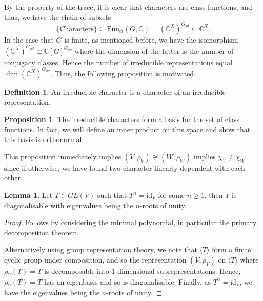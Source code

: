 \documentclass[]{article}
\theoremstyle{definition}
\theoremstyle{definition}
\newtheorem{definition}{Definition}[section]
\newtheorem{lemma}{Lemma}[section]
\newtheorem{proposition}{Proposition}[section]
\begin{document}
By the property of the trace, it is clear that characters are class functions,
and thus, we have the chain of subsets 
\[\{\text{Characters}\} \subseteq \text{Fun}_{cl}(G, \mathbb{C}) = 
(\mathbb{C}^X)^{G_{ad}} \subseteq \mathbb{C}^X.\]
In the case that \(G\) is finite, as mentioned before, we have the isomorphism 
\((\mathbb{C}^X)^{G_{ad}} \cong \mathbb{C}[G]^{G_{ad}}\) where the dimension of 
the latter is the number of conjugacy classes. Hence the number of irreducible 
representations equal \(\dim (\mathbb{C}^X)^{G_{ad}}\). Thus, the following 
proposition is motivated.

\begin{definition}
  An irreducible character is a character of an irreducible representation.
\end{definition}

\begin{proposition}
  The irreducible characters form a basis for the set of class functions. 
  In fact, we will define an inner product on this space and show that 
  this basis is orthonormal.
\end{proposition}

This proposition immediately implies \((V, \rho_V) \not\cong (W, \rho_W)\) 
implies \(\chi_V \neq \chi_W\) since if otherwise, we have found two character 
linearly dependent with each other.

\begin{lemma}
  Let \(T \in GL(V)\) such that \(T^n = \text{id}_V\) for some \(n \ge 1\), 
  then \(T\) is diagonalisable with eigenvalues being the \(n\)-roots of unity.
\end{lemma}
\begin{proof}
  Follows by considering the minimal polynomial, in particular the primary 
  decomposition theorem.

  Alternatively using group representation theory, we note that 
  \(\langle T \rangle\) form a finite cyclic group under composition, and 
  so the representation \((V, \rho_V)\) on \(\langle T \rangle\) where 
  \(\rho_V(T) = T\) is decomposable into 1-dimensional subrepresentations. 
  Hence, \(\rho_V(T) = T\) has an eigenbasis and so is diagonalisable. 
  Finally, as \(T^n = \text{id}_V\), we have the 
  eigenvalues being the \(n\)-roots of unity.
\end{proof}
\end{document}

